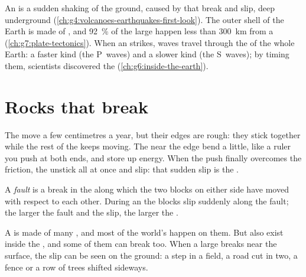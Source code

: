 \begin{recall}
An \emph{} is a sudden shaking of the ground, caused by 
that break and slip, deep underground
(\cref{ch:g4:volcanoes-earthquakes-first-look}). The outer shell of the
Earth is made of , and 92~\% of the large  happen less
than \qty{300}{km} from a  (\cref{ch:g7:plate-tectonics}).
When an  strikes, waves travel through the  of the whole
Earth: a faster kind (the P~waves) and a slower kind (the S~waves); by
timing them, scientists discovered the 
(\cref{ch:g6:inside-the-earth}).
\end{recall}

\section{Rocks that break}

The  move a few centimetres a year, but their edges are rough: they
stick together while the rest of the  keeps moving. The  near
the edge bend a little, like a ruler you push at both ends, and store up
energy. When the push finally overcomes the friction, the  unstick
all at once and slip: that sudden slip is the .

\begin{definition}[Fault]\label{def:g7:earthquakes:fault}
A \emph{fault} is a break in the  along which the two
blocks on either side have moved with respect to each other. During an
 the blocks slip suddenly along the fault; the larger the
fault and the slip, the larger the .
\end{definition}

A  is made of many , and most of the world's
 happen on them. But  also exist inside the , and
some of them can break too. When a large  breaks near the surface,
the slip can be seen on the ground: a step in a field, a road cut in two,
a fence or a row of trees shifted sideways.

